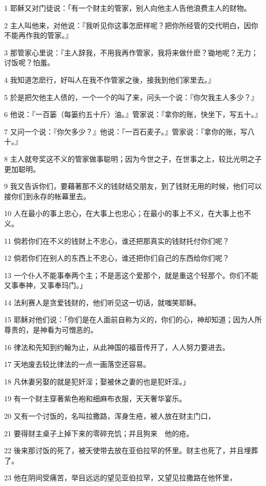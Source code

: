 \par 1 耶稣又对门徒说：「有一个财主的管家，别人向他主人告他浪费主人的财物。
\par 2 主人叫他来，对他说：『我听见你这事怎麽样呢？把你所经管的交代明白，因你不能再作我的管家。』
\par 3 那管家心里说：『主人辞我，不用我再作管家，我将来做什麽？锄地呢？无力；讨饭呢？怕羞。
\par 4 我知道怎麽行，好叫人在我不作管家之後，接我到他们家里去。』
\par 5 於是把欠他主人债的，一个一个的叫了来，问头一个说：『你欠我主人多少？』
\par 6 他说：『一百篓（每篓约五十斤）油。』管家说：『拿你的账，快坐下，写五十。』
\par 7 又问一个说：『你欠多少？』他说：『一百石麦子。』管家说：『拿你的账，写八十。』
\par 8 主人就夸奖这不义的管家做事聪明；因为今世之子，在世事之上，较比光明之子更加聪明。
\par 9 我又告诉你们，要藉著那不义的钱财结交朋友，到了钱财无用的时候，他们可以接你们到永存的帐幕里去。
\par 10 人在最小的事上忠心，在大事上也忠心；在最小的事上不义，在大事上也不义。
\par 11 倘若你们在不义的钱财上不忠心，谁还把那真实的钱财托付你们呢？
\par 12 倘若你们在别人的东西上不忠心，谁还把你们自己的东西给你们呢？
\par 13 一个仆人不能事奉两个主；不是恶这个爱那个，就是重这个轻那个。你们不能又事奉神，又事奉玛门。」
\par 14 法利赛人是贪爱钱财的，他们听见这一切话，就嗤笑耶稣。
\par 15 耶稣对他们说：「你们是在人面前自称为义的，你们的心，神却知道；因为人所尊贵的，是神看为可憎恶的。
\par 16 律法和先知到约翰为止，从此神国的福音传开了，人人努力要进去。
\par 17 天地废去较比律法的一点一画落空还容易。
\par 18 凡休妻另娶的就是犯奸淫；娶被休之妻的也是犯奸淫。」
\par 19 有一个财主穿著紫色袍和细麻布衣服，天天奢华宴乐。
\par 20 又有一个讨饭的，名叫拉撒路，浑身生疮，被人放在财主门口，
\par 21 要得财主桌子上掉下来的零碎充饥；并且狗来　他的疮。
\par 22 後来那讨饭的死了，被天使带去放在亚伯拉罕的怀里。财主也死了，并且埋葬了。
\par 23 他在阴间受痛苦，举目远远的望见亚伯拉罕，又望见拉撒路在他怀里，
